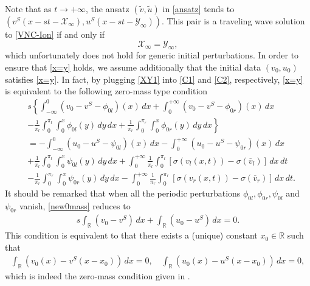 \documentclass[12pt,reqno]{amsart}
\numberwithin{equation}{section}
\def\R{\mathbb{R}}
\def\avl{\overline{v}_l}
\def\avr{\overline{v}_r}
\def\aul{\overline{u}_l}
\def\aur{\overline{u}_r}
\def\vt{\tilde{v}}
\def\ut{\tilde{u}}
\def\X{\mathcal{X}}
\def\Y{\mathcal{Y}}
\begin{document}
Note that as $t \to +\infty$, the ansatz $(\vt,\ut)$ in \eqref{ansatz} tends to $(v^S(x-st-\X_{\infty}),u^S(x-st-\Y_{\infty}))$. This pair is a
traveling wave solution to \eqref{VNC-Ion} if and only if 
\begin{equation}\label{x=y}
	\X_{\infty}=\Y_{\infty},
\end{equation}
which unfortunately does not hold for generic initial perturbations. In order to ensure
that \eqref{x=y} holds, we assume additionally that the initial data $(v_0,u_0)$ satisfies \eqref{x=y}. In fact,
by plugging \eqref{XY1} into \eqref{C1} and \eqref{C2}, respectively,  \eqref{x=y} is equivalent to the following zero-mass type condition
\begin{equation}\label{new0mass}
	\begin{aligned}
		&s\left\{\int_{-\infty}^{0}(v_0-v^S-\phi_{0l})(x)\,dx+\int_{0}^{+\infty} (v_0-v^S-\phi_{0r})(x)\,dx\right.\\
		&\left.-\frac{1}{\pi_l}\int_{0}^{\pi_l}\int_{0}^{x} \phi_{0l}(y) \,dy \,dx+\frac{1}{\pi_r}\int_{0}^{\pi_r}\int_{0}^{x} \phi_{0r}(y) \,dy \,dx\right\}\\
		&=-\int_{-\infty}^{0}(u_0-u^S-\psi_{0l})(x)\,dx-\int_{0}^{+\infty}(u_0-u^S-\psi_{0r})(x)\,dx\\
		&+\frac{1}{\pi_l}\int_{0}^{\pi_l}\int_{0}^{x} \psi_{0l}(y) \,dy \,dx+\int_{0}^{+\infty}\frac{1}{\pi_l}\int_{0}^{\pi_l}[\sigma(v_l(x,t))-\sigma(\avl)] \,dx \,dt\\
		&-\frac{1}{\pi_r}\int_{0}^{\pi_r}\int_{0}^{x} \psi_{0r}(y) \,dy \,dx-\int_{0}^{+\infty}\frac{1}{\pi_r}\int_{0}^{\pi_r}[\sigma(v_r(x,t))-\sigma(\avr)] \,dx \,dt.
	\end{aligned}
\end{equation}
It should be remarked that when all the periodic perturbations $\phi_{0l},\phi_{0r},\psi_{0l}$ and $\psi_{0r}$ vanish, \eqref{new0mass} reduces to
	\begin{align*}
		s\int_{\R}(v_0-v^S)\,dx+\int_{\R}(u_0-u^S)\,dx=0.
	\end{align*}
    This condition is equivalent to that there exists a (unique) constant $x_0 \in \R$ such that 
    \begin{align*}
		\int_{\R} (v_0(x)-v^S(x-x_0)) \,dx=0, \quad  \int_{\R} (u_0(x)-u^S(x-x_0)) \,dx=0,
    \end{align*}
    which is indeed the zero-mass condition given in \cite{Goodman.1986,zero-mass}. 

\end{document}
